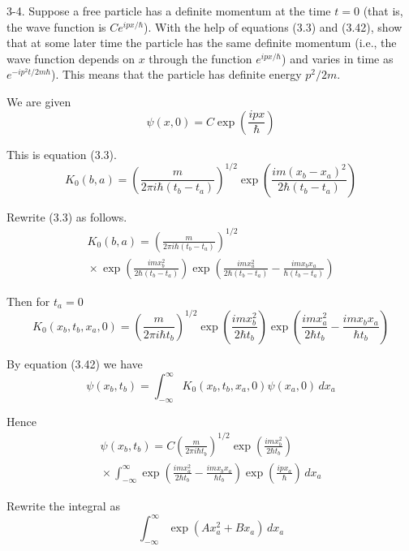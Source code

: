 \documentclass[12pt]{article}
\begin{document}
3-4.
Suppose a free particle has a definite momentum at the
time $t=0$ (that is, the wave function is $Ce^{ipx/\hbar}$).
With the help of equations (3.3) and (3.42),
show that at some later time the particle has the same
definite momentum
(i.e., the wave function depends on $x$ through the
function $e^{ipx/\hbar}$)
and varies in time as
$e^{-ip^2t/2m\hbar}$).
This means that the particle has definite energy $p^2/2m$.

\bigskip
We are given
\begin{equation*}
\psi(x,0)=C\exp\left(\frac{ipx}{\hbar}\right)
\end{equation*}

\noindent
This is equation (3.3).
\begin{equation*}
K_0(b,a)=\left(\frac{m}{2\pi i\hbar(t_b-t_a)}\right)^{1/2}
\exp\left(\frac{im(x_b-x_a)^2}{2\hbar(t_b-t_a)}\right)
\tag{3.3}
\end{equation*}

Rewrite (3.3) as follows.
\begin{multline*}
K_0(b,a)=\left(\frac{m}{2\pi i\hbar(t_b-t_a)}\right)^{1/2}
\\
{}\times\exp\left(\frac{imx_b^2}{2\hbar(t_b-t_a)}\right)
\exp\left(\frac{imx_a^2}{2\hbar(t_b-t_a)}-\frac{imx_bx_a}{\hbar(t_b-t_a)}\right)
\end{multline*}

Then for $t_a=0$
\begin{equation*}
K_0(x_b,t_b,x_a,0)=\left(\frac{m}{2\pi i\hbar t_b}\right)^{1/2}
\exp\left(\frac{imx_b^2}{2\hbar t_b}\right)
\exp\left(\frac{imx_a^2}{2\hbar t_b}-\frac{imx_bx_a}{\hbar t_b}\right)
\end{equation*}

By equation (3.42) we have
\begin{equation*}
\psi(x_b,t_b)=\int_{-\infty}^\infty K_0(x_b,t_b,x_a,0)\psi(x_a,0)\,dx_a
\end{equation*}

Hence
\begin{multline*}
\psi(x_b,t_b)=C\left(\frac{m}{2\pi i\hbar t_b}\right)^{1/2}
\exp\left(\frac{imx_b^2}{2\hbar t_b}\right)
\\
{}\times\int_{-\infty}^\infty
\exp\left(\frac{imx_a^2}{2\hbar t_b}-\frac{imx_bx_a}{\hbar t_b}\right)
\exp\left(\frac{ipx_a}{\hbar}\right)\,dx_a
\tag{1}
\end{multline*}

Rewrite the integral as
\begin{equation*}
\int_{-\infty}^\infty\exp(Ax_a^2+Bx_a)\,dx_a
\end{equation*}
\end{document}
